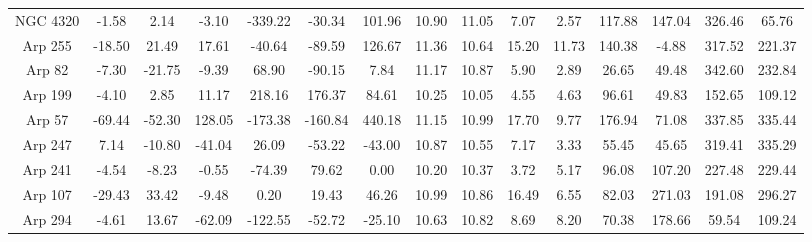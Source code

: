 \begin{table}
{\begin{tabular}{|c|c|c|c|c|c|c|c|c|c|c|c|c|c|c|}
     NGC 4320 &    -1.58 &     2.14 &    -3.10 &              -339.22 &               -30.34 &               101.96 &                          10.90 &                          11.05 &          7.07 &          2.57 &      117.88 &      147.04 &        326.46 &         65.76 \\
      Arp 255 &   -18.50 &    21.49 &    17.61 &               -40.64 &               -89.59 &               126.67 &                          11.36 &                          10.64 &         15.20 &         11.73 &      140.38 &       -4.88 &        317.52 &        221.37 \\
       Arp 82 &    -7.30 &   -21.75 &    -9.39 &                68.90 &               -90.15 &                 7.84 &                          11.17 &                          10.87 &          5.90 &          2.89 &       26.65 &       49.48 &        342.60 &        232.84 \\
      Arp 199 &    -4.10 &     2.85 &    11.17 &               218.16 &               176.37 &                84.61 &                          10.25 &                          10.05 &          4.55 &          4.63 &       96.61 &       49.83 &        152.65 &        109.12 \\
       Arp 57 &   -69.44 &   -52.30 &   128.05 &              -173.38 &              -160.84 &               440.18 &                          11.15 &                          10.99 &         17.70 &          9.77 &      176.94 &       71.08 &        337.85 &        335.44 \\
      Arp 247 &     7.14 &   -10.80 &   -41.04 &                26.09 &               -53.22 &               -43.00 &                          10.87 &                          10.55 &          7.17 &          3.33 &       55.45 &       45.65 &        319.41 &        335.29 \\
      Arp 241 &    -4.54 &    -8.23 &    -0.55 &               -74.39 &                79.62 &                 0.00 &                          10.20 &                          10.37 &          3.72 &          5.17 &       96.08 &      107.20 &        227.48 &        229.44 \\
      Arp 107 &   -29.43 &    33.42 &    -9.48 &                 0.20 &                19.43 &                46.26 &                          10.99 &                          10.86 &         16.49 &          6.55 &       82.03 &      271.03 &        191.08 &        296.27 \\
      Arp 294 &    -4.61 &    13.67 &   -62.09 &              -122.55 &               -52.72 &               -25.10 &                          10.63 &                          10.82 &          8.69 &          8.20 &       70.38 &      178.66 &         59.54 &        109.24 \\

\end{tabular}}
\end{table}
